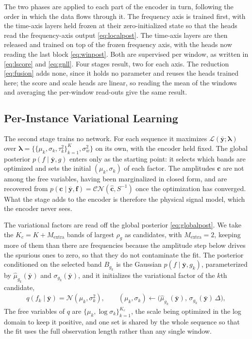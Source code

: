 \documentclass[journal,onecolumn]{IEEEtran}
\begin{document}
The two phases are applied to each part of the encoder in turn, following the order in which the data flows through it. The frequency axis is trained first, with the time-axis layers held frozen at their zero-initialized state so that the heads read the frequency-axis output \eqref{eq:localpost}. The time-axis layers are then released and trained on top of the frozen frequency axis, with the heads now reading the last block \eqref{eq:winpost}. Both are supervised per window, as written in \eqref{eq:lscore} and \eqref{eq:gnll}. Four stages result, two for each axis. The reduction \eqref{eq:fusion} adds none, since it holds no parameter and reuses the heads trained here; the score and scale heads are linear, so reading the mean of the windows and averaging the per-window read-outs give the same result.

\subsection{Per-Instance Variational Learning}
\label{sec:refine}

The second stage trains no network. For each sequence it maximizes $\mathcal{L}(\bar{\mathbf{y}};\pmb{\lambda})$ over $\pmb{\lambda}=\{\{\mu_k,\sigma_k,\tau_k^2\}_{k=1}^{K},\sigma_w^2\}$ on its own, with the encoder held fixed. The global posterior $p(f\mid\bar{\mathbf{y}},g)$ enters only as the starting point: it selects which bands are optimized and sets the initial $(\mu_k,\sigma_k)$ of each factor. The amplitudes $\mathbf{c}$ are not among the free variables, having been marginalized in closed form, and are recovered from $p(\mathbf{c}\mid\bar{\mathbf{y}},\mathbf{f})=\mathcal{CN}(\hat{\mathbf{c}},S^{-1})$ once the optimization has converged. What the stage adds to the encoder is therefore the physical signal model, which the encoder never sees.

The variational factors are read off the global posterior \eqref{eq:globalpost}. We take the $K_c=K+M_{\mathrm{extra}}$ bands of largest $\rho_g$ as candidates, with $M_{\mathrm{extra}}=2$, keeping more of them than there are frequencies because the amplitude step below drives the spurious ones to zero, so that they do not contaminate the fit. The posterior conditioned on the selected band $B_{g_k}$ is the Gaussian $p(f\mid\bar{\mathbf{y}},g_k)$, parameterized by $\hat\mu_{g_k}(\bar{\mathbf{y}})$ and $\sigma_{g_k}(\bar{\mathbf{y}})$, and it initializes the variational factor of the $k$th candidate,
\begin{eqnarray}
\label{eq:qinit}
q(f_k\mid\bar{\mathbf{y}})=\mathcal{N}(\mu_k,\sigma_k^2),
\qquad
(\mu_k,\sigma_k)\leftarrow\big(\hat\mu_{g_k}(\bar{\mathbf{y}}),\,\sigma_{g_k}(\bar{\mathbf{y}})\,\Delta\big),
\end{eqnarray}
The free variables of $q$ are $\{\mu_k,\log\sigma_k\}_{k=1}^{K_c}$, the scale being optimized in the log domain to keep it positive, and one set is shared by the whole sequence so that the fit uses the full observation length rather than any single window.
\end{document}
